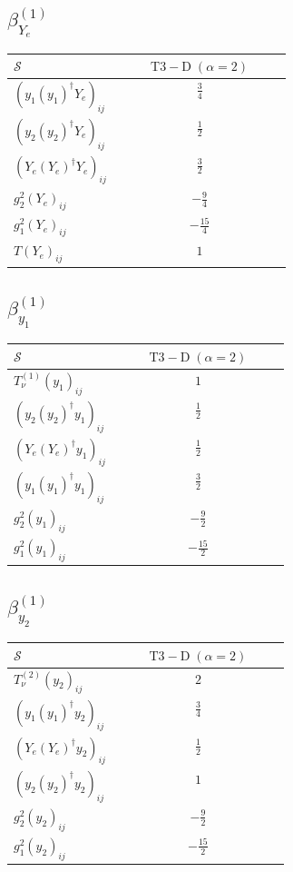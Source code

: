 \documentclass[9pt]{article}
\begin{document}
\subsection*{$ \beta_{Y_e}^{(1)} $}
\begin{longtable}{@{}p{0.38\linewidth}c@{}}
\toprule
$\mathcal{S}$ & $ \mathrm{T3-D}\;(\alpha=2) $ \\
\midrule
$ (y_1 (y_1)^{\dagger} Y_e)_{ij} $ & $ \frac{3}{4} $ \\
$ (y_2 (y_2)^{\dagger} Y_e)_{ij} $ & $ \frac{1}{2} $ \\
$ (Y_e (Y_e)^{\dagger} Y_e)_{ij} $ & $ \frac{3}{2} $ \\
$ g_2^2 (Y_e)_{ij} $ & $ - \frac{9}{4} $ \\
$ g_1^2 (Y_e)_{ij} $ & $ - \frac{15}{4} $ \\
$ T (Y_e)_{ij} $ & $ 1 $ \\
\bottomrule
\end{longtable}
\subsection*{$ \beta_{y_1}^{(1)} $}
\begin{longtable}{@{}p{0.38\linewidth}c@{}}
\toprule
$\mathcal{S}$ & $ \mathrm{T3-D}\;(\alpha=2) $ \\
\midrule
$ T_{\nu}^{(1)} (y_1)_{ij} $ & $ 1 $ \\
$ (y_2 (y_2)^{\dagger} y_1)_{ij} $ & $ \frac{1}{2} $ \\
$ (Y_e (Y_e)^{\dagger} y_1)_{ij} $ & $ \frac{1}{2} $ \\
$ (y_1 (y_1)^{\dagger} y_1)_{ij} $ & $ \frac{3}{2} $ \\
$ g_2^2 (y_1)_{ij} $ & $ - \frac{9}{2} $ \\
$ g_1^2 (y_1)_{ij} $ & $ - \frac{15}{2} $ \\
\bottomrule
\end{longtable}
\subsection*{$ \beta_{y_2}^{(1)} $}
\begin{longtable}{@{}p{0.38\linewidth}c@{}}
\toprule
$\mathcal{S}$ & $ \mathrm{T3-D}\;(\alpha=2) $ \\
\midrule
$ T_{\nu}^{(2)} (y_2)_{ij} $ & $ 2 $ \\
$ (y_1 (y_1)^{\dagger} y_2)_{ij} $ & $ \frac{3}{4} $ \\
$ (Y_e (Y_e)^{\dagger} y_2)_{ij} $ & $ \frac{1}{2} $ \\
$ (y_2 (y_2)^{\dagger} y_2)_{ij} $ & $ 1 $ \\
$ g_2^2 (y_2)_{ij} $ & $ - \frac{9}{2} $ \\
$ g_1^2 (y_2)_{ij} $ & $ - \frac{15}{2} $ \\
\bottomrule
\end{longtable}
\end{document}
